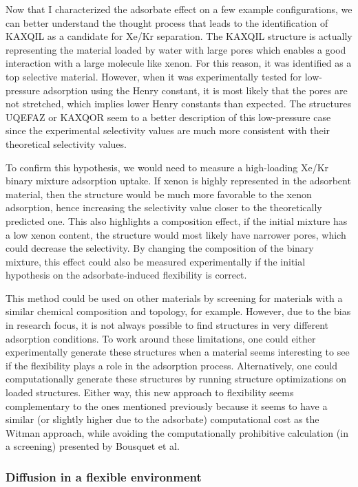 \documentclass[main]{subfiles}
\begin{document}
Now that I characterized the adsorbate effect on a few example configurations, we can better understand the thought process that leads to the identification of KAXQIL as a candidate for Xe/Kr separation. The KAXQIL structure is actually representing the material loaded by water with large pores which enables a good interaction with a large molecule like xenon. For this reason, it was identified as a top selective material. However, when it was experimentally tested for low-pressure adsorption using the Henry constant, it is most likely that the pores are not stretched, which implies lower Henry constants than expected. The structures UQEFAZ or KAXQOR seem to a better description of this low-pressure case since the experimental selectivity values are much more consistent with their theoretical selectivity values. 

To confirm this hypothesis, we would need to measure a high-loading Xe/Kr binary mixture adsorption uptake. If xenon is highly represented in the adsorbent material, then the structure would be much more favorable to the xenon adsorption, hence increasing the selectivity value closer to the theoretically predicted one. This also highlights a composition effect, if the initial mixture has a low xenon content, the structure would most likely have narrower pores, which could decrease the selectivity. By changing the composition of the binary mixture, this effect could also be measured experimentally if the initial hypothesis on the adsorbate-induced flexibility is correct.

This method could be used on other materials by screening for materials with a similar chemical composition and topology, for example. However, due to the bias in research focus, it is not always possible to find structures in very different adsorption conditions. To work around these limitations, one could either experimentally generate these structures when a material seems interesting to see if the flexibility plays a role in the adsorption process. Alternatively, one could computationally generate these structures by running structure optimizations on loaded structures. Either way, this new approach to flexibility seems complementary to the ones mentioned previously because it seems to have a similar (or slightly higher due to the adsorbate) computational cost as the Witman approach, while avoiding the computationally prohibitive calculation (in a screening) presented by Bousquet et al. 


\subsubsection{Diffusion in a flexible environment}
\end{document}
